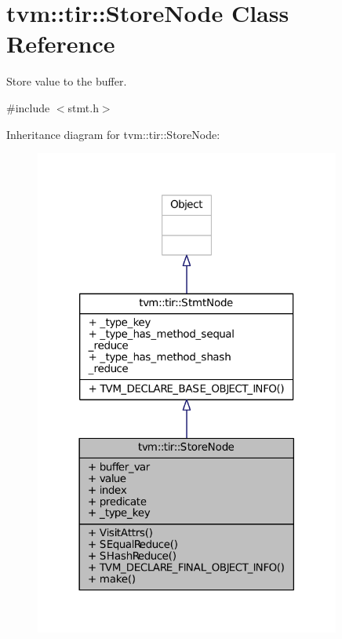 \hypertarget{classtvm_1_1tir_1_1StoreNode}{}\section{tvm\+:\+:tir\+:\+:Store\+Node Class Reference}
\label{classtvm_1_1tir_1_1StoreNode}


Store value to the buffer.  




{\ttfamily \#include $<$stmt.\+h$>$}



Inheritance diagram for tvm\+:\+:tir\+:\+:Store\+Node\+:
\nopagebreak
\begin{figure}[H]
\begin{center}
\leavevmode
\includegraphics[width=285pt]{classtvm_1_1tir_1_1StoreNode__inherit__graph}
\end{center}
\end{figure}


